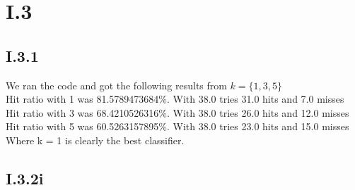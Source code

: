 \documentclass{article}
\begin{document}
\section{I.3}


\subsection{I.3.1}
We ran the code and got the following results from $k = \{1,3,5\}$\\
Hit ratio with 1 was 81.5789473684\%. With 38.0 tries 31.0 hits and 7.0 misses\\
Hit ratio with 3 was 68.4210526316\%. With 38.0 tries 26.0 hits and 12.0 misses\\
Hit ratio with 5 was 60.5263157895\%. With 38.0 tries 23.0 hits and 15.0 misses\\
Where k = 1 is clearly the best classifier.\\

\subsection{I.3.2i}
\end{document}
